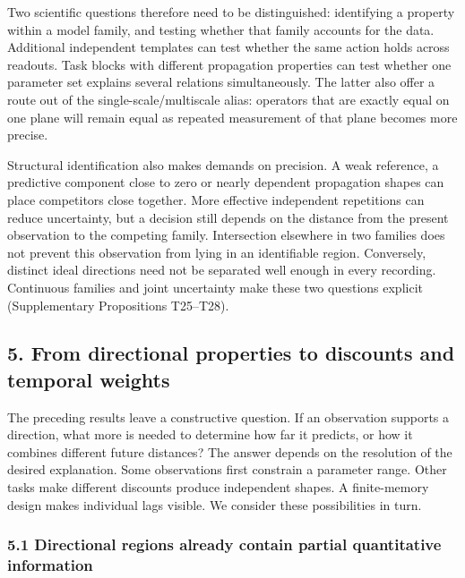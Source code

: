 \documentclass[11pt,a4paper]{article}
\begin{document}
Two scientific questions therefore need to be distinguished: identifying
a property within a model family, and testing whether that family
accounts for the data. Additional independent templates can test whether
the same action holds across readouts. Task blocks with different
propagation properties can test whether one parameter set explains
several relations simultaneously. The latter also offer a route out of
the single-scale/multiscale alias: operators that are exactly equal on
one plane will remain equal as repeated measurement of that plane
becomes more precise.

Structural identification also makes demands on precision. A weak
reference, a predictive component close to zero or nearly dependent
propagation shapes can place competitors close together. More effective
independent repetitions can reduce uncertainty, but a decision still
depends on the distance from the present observation to the competing
family. Intersection elsewhere in two families does not prevent this
observation from lying in an identifiable region. Conversely, distinct
ideal directions need not be separated well enough in every recording.
Continuous families and joint uncertainty make these two questions
explicit (Supplementary Propositions T25–T28).

\subsection{5. From directional properties to discounts and temporal
weights}\label{from-directional-properties-to-discounts-and-temporal-weights}

The preceding results leave a constructive question. If an observation
supports a direction, what more is needed to determine how far it
predicts, or how it combines different future distances? The answer
depends on the resolution of the desired explanation. Some observations
first constrain a parameter range. Other tasks make different discounts
produce independent shapes. A finite-memory design makes individual lags
visible. We consider these possibilities in turn.

\subsubsection{5.1 Directional regions already contain partial
quantitative
information}\label{directional-regions-already-contain-partial-quantitative-information}
\end{document}
